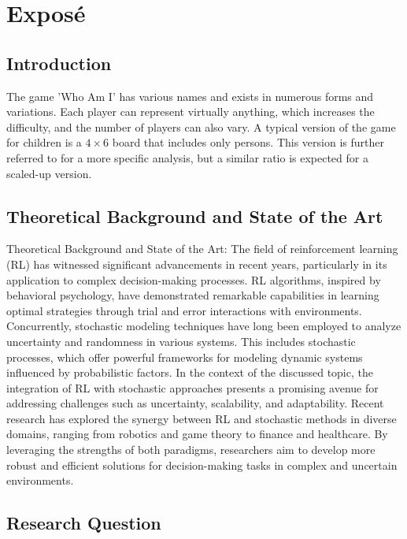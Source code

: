 \chapter{Exposé}

\section{Introduction}

The game 'Who Am I' has various names and exists in numerous forms and variations. Each player can represent virtually anything, which increases the difficulty, and the number of players can also vary. A typical version of the game for children is a $4 \times 6$ board that includes only persons. This version is further referred to for a more specific analysis, but a similar ratio is expected for a scaled-up version.

\section{Theoretical Background and State of the Art}
\label{sec:state-of-the-art}

Theoretical Background and State of the Art: The field of reinforcement learning (RL) has witnessed significant advancements in recent years, particularly in its application to complex decision-making processes. RL algorithms, inspired by behavioral psychology, have demonstrated remarkable capabilities in learning optimal strategies through trial and error interactions with environments. Concurrently, stochastic modeling techniques have long been employed to analyze uncertainty and randomness in various systems. This includes stochastic processes, which offer powerful frameworks for modeling dynamic systems influenced by probabilistic factors. In the context of the discussed topic, the integration of RL with stochastic approaches presents a promising avenue for addressing challenges such as uncertainty, scalability, and adaptability. Recent research has explored the synergy between RL and stochastic methods in diverse domains, ranging from robotics and game theory to finance and healthcare. By leveraging the strengths of both paradigms, researchers aim to develop more robust and efficient solutions for decision-making tasks in complex and uncertain environments.


\section{Research Question}

